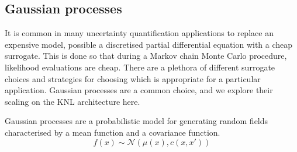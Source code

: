 \subsection{Gaussian processes}
\label{sec:chol}

It is common in many uncertainty quantification applications to replace an
expensive model, possible a discretised partial differential equation with a
cheap surrogate.  This is done so that during a Markov chain Monte Carlo
procedure, likelihood evaluations are cheap.  There are a plethora of different
surrogate choices and strategies for choosing which is appropriate for a
particular application.  Gaussian processes are a common choice, and we explore
their scaling on the KNL architecture here.


Gaussian processes are a probabilistic model for generating random fields
characterised by a mean function and a covariance function.
\begin{equation}
  f(x) \sim \mathcal{N}(\mu(x), c(x, x'))
\end{equation}

